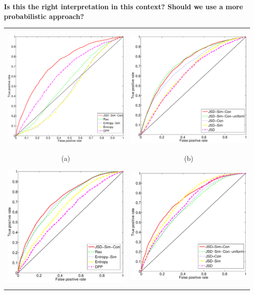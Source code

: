 {\bf Is this the right interpretation in this context? Should we use a
  more probabilistic approach? }
  
  
  \begin{table}[t]
\begin{center}
\begin{tabular}{CC}
\includegraphics[height=6.5cm]{figures/phonecases-comparison-new.eps}&\includegraphics[height=6.5cm]{figures/phonecases-breakdown-new.eps}\\
(a) & (b)\\
\includegraphics[height=6.5cm]{figures/nsf-comparison-new.eps}&\includegraphics[height=6.5cm]{figures/nsf-breakdown-new.eps}\\

\end{tabular}
\end{center}
\end{table}
